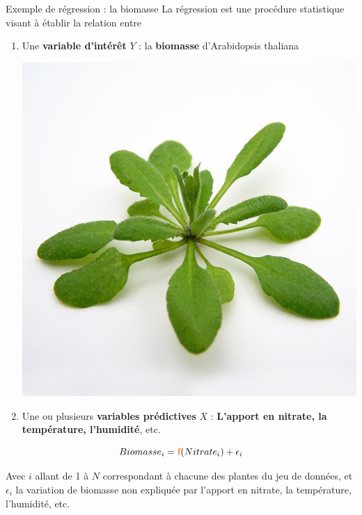 	
	\begin{frame}{Exemple de régression : la biomasse}
	La régression est une procédure statistique visant à établir la relation entre
	
	
		\begin{enumerate}
		    \item Une \textbf{variable d'intérêt} $Y$ : la \textbf{biomasse} d'Arabidopsis thaliana 
		    
		    \centering \includegraphics[scale = 0.041]{Figures/Intro/Arabidopsis.jpg}
		
		    
		    \item Une ou plusieurs \textbf{variables prédictives} $X$ :  \textbf{L'apport en nitrate, la température, l'humidité}, etc.
		\end{enumerate}
		
		
		\Large
		
		\begin{equation*}
		    Biomasse_i = \textcolor{orange}{\textbf{f}}(Nitrate_i) + \epsilon_i
		\end{equation*}
		
		\small
		Avec $i$ allant de 1 à $N$ correspondant à chacune des plantes du jeu de données, et $\epsilon_i$ la variation de biomasse non expliquée par l'apport en nitrate, la température, l'humidité, etc.

	\end{frame}
	
